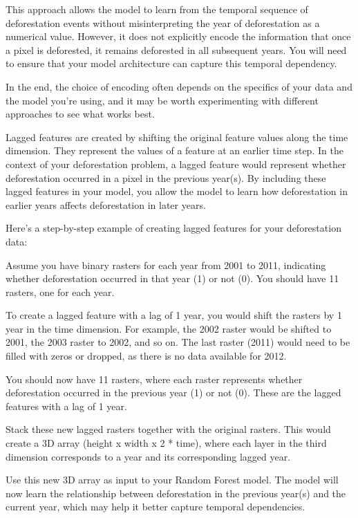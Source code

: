 \documentclass[
  letterpaper,
  DIV=11,
  numbers=noendperiod]{scrartcl}
\begin{document}
This approach allows the model to learn from the temporal sequence of
deforestation events without misinterpreting the year of deforestation
as a numerical value. However, it does not explicitly encode the
information that once a pixel is deforested, it remains deforested in
all subsequent years. You will need to ensure that your model
architecture can capture this temporal dependency.

In the end, the choice of encoding often depends on the specifics of
your data and the model you're using, and it may be worth experimenting
with different approaches to see what works best.

Lagged features are created by shifting the original feature values
along the time dimension. They represent the values of a feature at an
earlier time step. In the context of your deforestation problem, a
lagged feature would represent whether deforestation occurred in a pixel
in the previous year(s). By including these lagged features in your
model, you allow the model to learn how deforestation in earlier years
affects deforestation in later years.

Here's a step-by-step example of creating lagged features for your
deforestation data:

Assume you have binary rasters for each year from 2001 to 2011,
indicating whether deforestation occurred in that year (1) or not (0).
You should have 11 rasters, one for each year.

To create a lagged feature with a lag of 1 year, you would shift the
rasters by 1 year in the time dimension. For example, the 2002 raster
would be shifted to 2001, the 2003 raster to 2002, and so on. The last
raster (2011) would need to be filled with zeros or dropped, as there is
no data available for 2012.

You should now have 11 rasters, where each raster represents whether
deforestation occurred in the previous year (1) or not (0). These are
the lagged features with a lag of 1 year.

Stack these new lagged rasters together with the original rasters. This
would create a 3D array (height x width x 2 * time), where each layer in
the third dimension corresponds to a year and its corresponding lagged
year.

Use this new 3D array as input to your Random Forest model. The model
will now learn the relationship between deforestation in the previous
year(s) and the current year, which may help it better capture temporal
dependencies.
\end{document}
